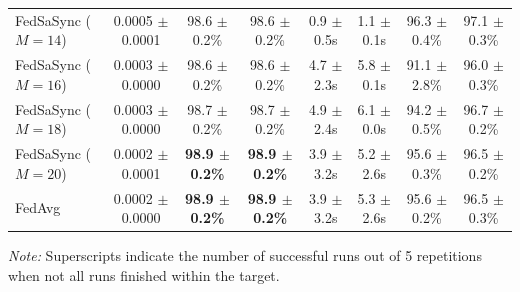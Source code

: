 \begin{table}[t]
{\begin{tabular}{lccccccc}
FedSaSync ($M = 14$) & 0.0005 $\pm$ 0.0001 & 98.6 $\pm$ 0.2\% & 98.6 $\pm$ 0.2\% & 0.9 $\pm$ 0.5s & 1.1 $\pm$ 0.1s & 96.3 $\pm$ 0.4\% & 97.1 $\pm$ 0.3\% \\
FedSaSync ($M = 16$) & 0.0003 $\pm$ 0.0000 & 98.6 $\pm$ 0.2\% & 98.6 $\pm$ 0.2\% & 4.7 $\pm$ 2.3s & 5.8 $\pm$ 0.1s & 91.1 $\pm$ 2.8\% & 96.0 $\pm$ 0.3\% \\
FedSaSync ($M = 18$) & 0.0003 $\pm$ 0.0000 & 98.7 $\pm$ 0.2\% & 98.7 $\pm$ 0.2\% & 4.9 $\pm$ 2.4s & 6.1 $\pm$ 0.0s & 94.2 $\pm$ 0.5\% & 96.7 $\pm$ 0.2\% \\
FedSaSync ($M = 20$) & 0.0002 $\pm$ 0.0001 & \textbf{98.9 $\pm$ 0.2\%} & \textbf{98.9 $\pm$ 0.2\%} & 3.9 $\pm$ 3.2s & 5.2 $\pm$ 2.6s & 95.6 $\pm$ 0.3\% & 96.5 $\pm$ 0.2\% \\
FedAvg & 0.0002 $\pm$ 0.0000 & \textbf{98.9 $\pm$ 0.2\%} & \textbf{98.9 $\pm$ 0.2\%} & 3.9 $\pm$ 3.2s & 5.3 $\pm$ 2.6s & 95.6 $\pm$ 0.2\% & 96.5 $\pm$ 0.3\% \\
\hline
\end{tabular}%
}
\par\vspace{0.8em}
\raggedright \footnotesize \textit{Note:} Superscripts indicate the number of successful runs out of 5 repetitions when not all runs finished within the target.
\end{table}